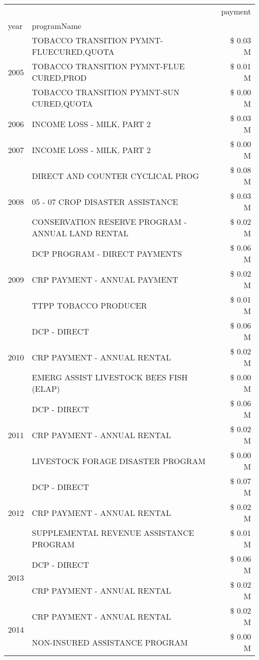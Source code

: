 \begin{tabular}{llr}
\toprule
 &  & payment \\
year & programName &  \\
\midrule
\multirow[t]{3}{*}{2005} & TOBACCO TRANSITION PYMNT-FLUECURED,QUOTA & \$ 0.03 M \\
 & TOBACCO TRANSITION PYMNT-FLUE CURED,PROD & \$ 0.01 M \\
 & TOBACCO TRANSITION PYMNT-SUN CURED,QUOTA & \$ 0.00 M \\
\cline{1-3}
2006 & INCOME LOSS - MILK, PART 2 & \$ 0.03 M \\
\cline{1-3}
2007 & INCOME LOSS - MILK, PART 2 & \$ 0.00 M \\
\cline{1-3}
\multirow[t]{3}{*}{2008} & DIRECT AND COUNTER CYCLICAL PROG & \$ 0.08 M \\
 & 05 - 07 CROP DISASTER ASSISTANCE & \$ 0.03 M \\
 & CONSERVATION RESERVE PROGRAM - ANNUAL LAND RENTAL & \$ 0.02 M \\
\cline{1-3}
\multirow[t]{3}{*}{2009} & DCP PROGRAM - DIRECT PAYMENTS & \$ 0.06 M \\
 & CRP PAYMENT - ANNUAL PAYMENT & \$ 0.02 M \\
 & TTPP TOBACCO PRODUCER & \$ 0.01 M \\
\cline{1-3}
\multirow[t]{3}{*}{2010} & DCP - DIRECT & \$ 0.06 M \\
 & CRP PAYMENT - ANNUAL RENTAL & \$ 0.02 M \\
 & EMERG ASSIST LIVESTOCK BEES FISH (ELAP) & \$ 0.00 M \\
\cline{1-3}
\multirow[t]{3}{*}{2011} & DCP - DIRECT & \$ 0.06 M \\
 & CRP PAYMENT - ANNUAL RENTAL & \$ 0.02 M \\
 & LIVESTOCK FORAGE DISASTER PROGRAM & \$ 0.00 M \\
\cline{1-3}
\multirow[t]{3}{*}{2012} & DCP - DIRECT & \$ 0.07 M \\
 & CRP PAYMENT - ANNUAL RENTAL & \$ 0.02 M \\
 & SUPPLEMENTAL REVENUE ASSISTANCE PROGRAM & \$ 0.01 M \\
\cline{1-3}
\multirow[t]{2}{*}{2013} & DCP - DIRECT & \$ 0.06 M \\
 & CRP PAYMENT - ANNUAL RENTAL & \$ 0.02 M \\
\cline{1-3}
\multirow[t]{2}{*}{2014} & CRP PAYMENT - ANNUAL RENTAL & \$ 0.02 M \\
 & NON-INSURED ASSISTANCE PROGRAM & \$ 0.00 M \\

\end{tabular}
